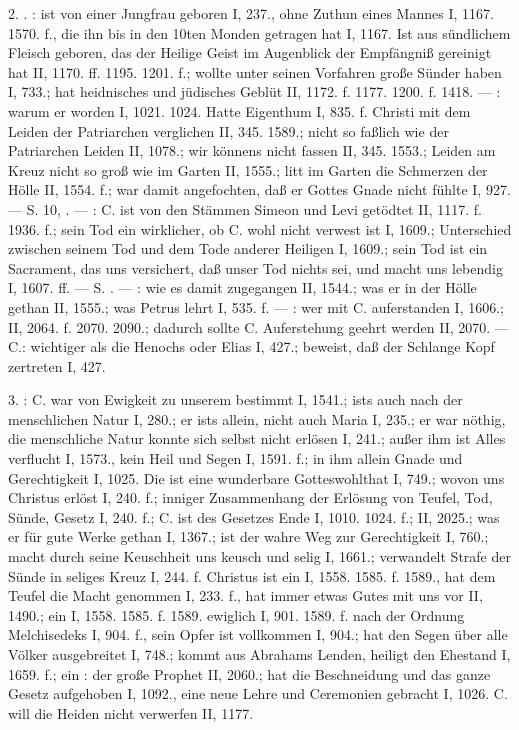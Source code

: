 2. . : ist von einer Jungfrau geboren I, 237., ohne Zuthun eines Mannes I, 1167. 1570. f., die ihn bis in den 10ten Monden getragen hat I, 1167. Ist aus sündlichem Fleisch geboren, das der Heilige Geist im Augenblick der Empfängniß gereinigt hat II, 1170. ff. 1195. 1201. f.; wollte unter seinen Vorfahren große Sünder haben I, 733.; hat heidnisches und jüdisches Geblüt II, 1172. f. 1177. 1200. f. 1418. — : warum er  worden I, 1021. 1024. Hatte Eigenthum I, 835. f. Christi  mit dem Leiden der Patriarchen verglichen II, 345. 1589.; nicht so faßlich wie der Patriarchen Leiden II, 1078.; wir könnens nicht fassen II, 345. 1553.; Leiden am Kreuz nicht so groß wie im Garten II, 1555.; litt im Garten die Schmerzen der Hölle II, 1554. f.; war damit angefochten, daß er Gottes Gnade nicht fühlte I, 927. — S.  10, . — : C. ist von den Stämmen Simeon und Levi getödtet II, 1117. f. 1936. f.; sein Tod ein wirklicher, ob C. wohl nicht verwest ist I, 1609.; Unterschied zwischen seinem Tod und dem Tode anderer Heiligen I, 1609.; sein Tod ist ein Sacrament, das uns versichert, daß unser Tod nichts sei, und macht uns lebendig I, 1607. ff. — S. . — : wie es damit zugegangen II, 1544.; was er in der Hölle gethan II, 1555.; was Petrus lehrt I, 535. f. — : wer mit C. auferstanden I, 1606.; II, 2064. f. 2070. 2090.; dadurch sollte C. Auferstehung geehrt werden II, 2070. —  C.: wichtiger als die Henochs oder Elias I, 427.; beweist, daß der Schlange Kopf zertreten I, 427.

3. : C. war von Ewigkeit zu unserem  bestimmt I, 1541.; ists auch nach der menschlichen Natur I, 280.; er ists allein, nicht auch Maria I, 235.; er war nöthig, die menschliche Natur konnte sich selbst nicht erlösen I, 241.; außer ihm ist Alles verflucht I, 1573., kein Heil und Segen I, 1591. f.; in ihm allein Gnade und Gerechtigkeit I, 1025. Die  ist eine wunderbare Gotteswohlthat I, 749.; wovon uns Christus erlöst I, 240. f.; inniger Zusammenhang der Erlösung von Teufel, Tod, Sünde, Gesetz I, 240. f.; C. ist des Gesetzes Ende I, 1010. 1024. f.; II, 2025.; was er für gute Werke gethan I, 1367.; ist der wahre Weg zur Gerechtigkeit I, 760.; macht durch seine Keuschheit uns keusch und selig I, 1661.; verwandelt Strafe der Sünde in seliges Kreuz I, 244. f. Christus ist ein  I, 1558. 1585. f. 1589., hat dem Teufel die Macht genommen I, 233. f., hat immer etwas Gutes mit uns vor II, 1490.; ein  I, 1558. 1585. f. 1589. ewiglich I, 901. 1589. f. nach der Ordnung Melchisedeks I, 904. f., sein Opfer ist vollkommen I, 904.; hat den Segen über alle Völker ausgebreitet I, 748.; kommt aus Abrahams Lenden, heiligt den Ehestand I, 1659. f.; ein : der große Prophet II, 2060.; hat die Beschneidung und das ganze Gesetz aufgehoben I, 1092., eine neue Lehre und Ceremonien gebracht I, 1026. C. will die Heiden nicht verwerfen II, 1177.

